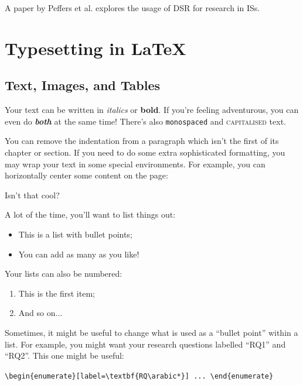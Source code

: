 \documentclass[12pt,reqno,twoside]{amsbook}
\begin{document}
A paper by Peffers et al. \cite{Peffers2007} explores the usage of \ac{DSR} for research in \acp{IS}.










\chapter{Typesetting in \LaTeX}\label{ch:typesetting}

\section{Text, Images, and Tables}\label{sec:text_images_tables}

Your text can be written in \textit{italics} or \textbf{bold}. If you're feeling adventurous, you can even do \textit{\textbf{both}} at the same time! There's also \texttt{monospaced} and \textsc{capitalised} text.

\noindent You can remove the indentation from a paragraph which isn't the first of its chapter or section. If you need to do some extra sophisticated formatting, you may wrap your text in some special environments. For example, you can horizontally center some content on the page:
\begin{center}
    Isn't that cool?
\end{center}

\noindent A lot of the time, you'll want to list things out:
\begin{itemize}
    \item This is a list with bullet points;
    \item You can add as many as you like!
\end{itemize}

\noindent Your lists can also be numbered:
\begin{enumerate}
    \item This is the first item;
    \item And so on...
\end{enumerate}

\noindent Sometimes, it might be useful to change what is used as a ``bullet point'' within a list. For example, you might want your research questions labelled ``RQ1'' and ``RQ2''. This one might be useful:

\begin{center}
    \verb|\begin{enumerate}[label=\textbf{RQ\arabic*}] ... \end{enumerate}|
\end{center}
\end{document}
